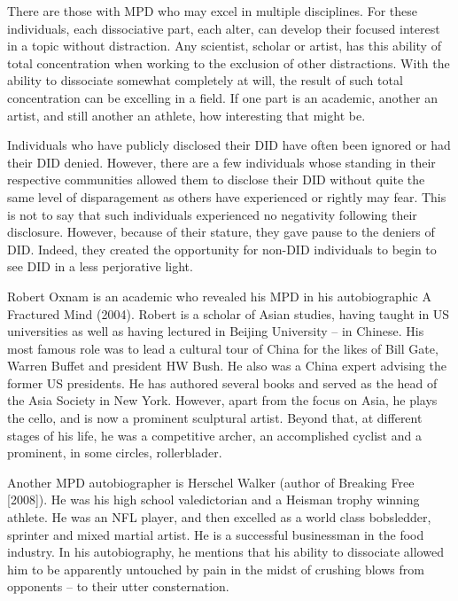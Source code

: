 \documentclass[]{book}
\begin{document}
There are those with MPD who may excel in multiple disciplines. For these individuals, each dissociative part, each alter, can develop their focused interest in a topic without distraction. Any scientist, scholar or artist, has this ability of total concentration when working to the exclusion of other distractions. With the ability to dissociate somewhat completely at will, the result of such total concentration can be excelling in a field. If one part is an academic, another an artist, and still another an athlete, how interesting that might be.

Individuals who have publicly disclosed their DID have often been ignored or had their DID denied. However, there are a few individuals whose standing in their respective communities allowed them to disclose their DID without quite the same level of disparagement as others have experienced or rightly may fear. This is not to say that such individuals experienced no negativity following their disclosure. However, because of their stature, they gave pause to the deniers of DID. Indeed, they created the opportunity for non-DID individuals to begin to see DID in a less perjorative light.

Robert Oxnam is an academic who revealed his MPD in his autobiographic A Fractured Mind (2004). Robert is a scholar of Asian studies, having taught in US universities as well as having lectured in Beijing University -- in Chinese. His most famous role was to lead a cultural tour of China for the likes of Bill Gate, Warren Buffet and president HW Bush. He also was a China expert advising the former US presidents. He has authored several books and served as the head of the Asia Society in New York. However, apart from the focus on Asia, he plays the cello, and is now a prominent sculptural artist. Beyond that, at different stages of his life, he was a competitive archer, an accomplished cyclist and a prominent, in some circles, rollerblader.

Another MPD autobiographer is Herschel Walker (author of Breaking Free {[}2008{]}). He was his high school valedictorian and a Heisman trophy winning athlete. He was an NFL player, and then excelled as a world class bobsledder, sprinter and mixed martial artist. He is a successful businessman in the food industry. In his autobiography, he mentions that his ability to dissociate allowed him to be apparently untouched by pain in the midst of crushing blows from opponents -- to their utter consternation.
\end{document}
